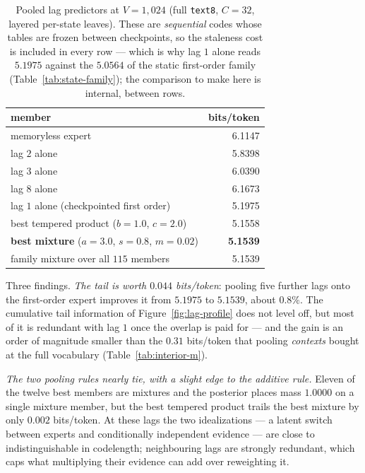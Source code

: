 \documentclass[11pt]{article}
\begin{document}
\begin{table}[ht]
\centering
\begin{tabular}{lr}
\toprule
member & bits/token \\
\midrule
memoryless expert                       & 6.1147 \\
lag $2$ alone                           & 5.8398 \\
lag $3$ alone                           & 6.0390 \\
lag $8$ alone                           & 6.1673 \\
lag $1$ alone (checkpointed first order) & 5.1975 \\
best tempered product ($b=1.0$, $c=2.0$) & 5.1558 \\
\textbf{best mixture} ($a=3.0$, $s=0.8$, $m=0.02$) & \textbf{5.1539} \\
family mixture over all $115$ members   & 5.1539 \\
\bottomrule
\end{tabular}
\caption{Pooled lag predictors at $V=1{,}024$ (full \texttt{text8},
  $C=32$, layered per-state leaves).  These are \emph{sequential}
  codes whose tables are frozen between checkpoints, so the staleness
  cost is included in every row --- which is why lag $1$ alone reads
  $5.1975$ against the $5.0564$ of the static first-order family
  (Table~\ref{tab:state-family}); the comparison to make here is
  internal, between rows.}
\label{tab:pooled-lags}
\end{table}

Three findings.  \emph{The tail is worth $0.044$ bits/token}: pooling
five further lags onto the first-order expert improves it from
$5.1975$ to $5.1539$, about $0.8\%$.  The cumulative tail information
of Figure~\ref{fig:lag-profile} does not level off, but most of it is
redundant with lag $1$ once the overlap is paid for --- and the gain
is an order of magnitude smaller than the $0.31$ bits/token that
pooling \emph{contexts} bought at the full vocabulary
(Table~\ref{tab:interior-m}).

\emph{The two pooling rules nearly tie, with a slight edge to the
additive rule.}  Eleven of the twelve best members are mixtures and
the posterior places mass $1.0000$ on a single mixture member, but
the best tempered product trails the best mixture by only $0.002$
bits/token.  At these lags the two idealizations --- a latent switch
between experts and conditionally independent evidence --- are close
to indistinguishable in codelength; neighbouring lags are strongly
redundant, which caps what multiplying their evidence can add over
reweighting it.
\end{document}
